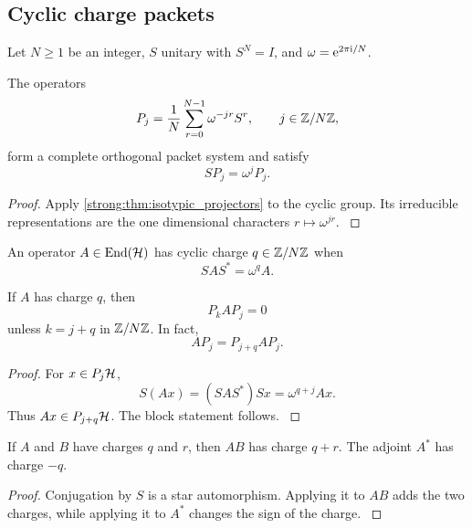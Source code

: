 \subsection{Cyclic charge packets}\label{strong:subsec:cyclic_charge}

Let \(N\ge1\) be an integer, \(S\) unitary with \(S^N=I\), and \(\omega=\e^{2\pi\ii/N}\).

\begin{corollary}\label{strong:corollary:002}\label{strong:cor:cyclic_projectors}
The operators
\[
P_j
=
\frac1N
\sum_{r=0}^{N-1}
\omega^{-jr}S^r,
\qquad
j\in\ZZ/N\ZZ,
\]
form a complete orthogonal packet system and satisfy
\[
SP_j=\omega^jP_j.
\]
\end{corollary}

\begin{proof}\label{strong:proof:007}
Apply \cref{strong:thm:isotypic_projectors} to the cyclic group. Its irreducible representations are the one dimensional characters \(r\mapsto\omega^{jr}\).
\label{strong:proof:007:end}\end{proof}

\begin{definition}\label{strong:definition:002}\label{strong:def:operator_charge}
An operator \(A\in\End(\Hcal)\) has cyclic charge \(q\in\ZZ/N\ZZ\) when
\[
SAS^*=\omega^qA.
\]
\end{definition}

\begin{theorem}\label{strong:theorem:005}\label{strong:thm:charge_selection}
If \(A\) has charge \(q\), then
\[
P_kAP_j=0
\]
unless \(k=j+q\) in \(\ZZ/N\ZZ\). In fact,
\[
AP_j=P_{j+q}AP_j.
\]
\end{theorem}

\begin{proof}\label{strong:proof:008}
For \(x\in P_j\Hcal\),
\[
S(Ax)
=(SAS^*)Sx
=\omega^{q+j}Ax.
\]
Thus \(Ax\in P_{j+q}\Hcal\). The block statement follows.
\label{strong:proof:008:end}\end{proof}

\begin{corollary}\label{strong:corollary:003}\label{strong:cor:charge_addition}
If \(A\) and \(B\) have charges \(q\) and \(r\), then \(AB\) has charge \(q+r\). The adjoint \(A^*\) has charge \(-q\).
\end{corollary}

\begin{proof}\label{strong:proof:009}
Conjugation by \(S\) is a star automorphism. Applying it to \(AB\) adds the two charges, while applying it to \(A^*\) changes the sign of the charge.
\label{strong:proof:009:end}\end{proof}

